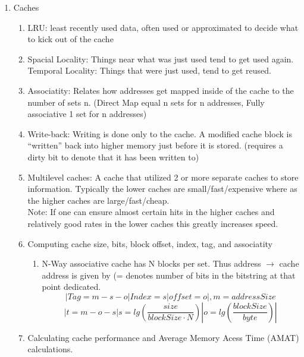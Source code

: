 \documentclass[12pt]{article}
\renewcommand{\=}[1]{\stackrel{#1}{=}} %
\theoremstyle{definition}
\theoremstyle{remark}
\begin{document}
  \begin{enumerate}
  \item Caches
    \begin{enumerate}
    \item LRU: least recently used data, often used or approximated to
      decide what to kick out of the cache
    \item
      Spacial Locality: Things near what was just used tend to get used
      again.\\
      Temporal Locality: Things that were just used, tend to get reused.
    \item Associatity: Relates how addresses get mapped inside of
      the cache to the number of sets n. (Direct Map equal n sets for
      n addresses, Fully associative 1 set for n addresses)
    \item Write-back: Writing is done only to the cache. A modified
      cache block is ``written'' back into higher memory just before
      it is stored. (requires a dirty bit to denote that it has been
      written to)
    \item Multilevel caches: A cache that utilized 2 or more separate
      caches to store information. Typically the lower caches are
      small/fast/expensive where as the higher caches are
      large/fast/cheap.\\
      Note: If one can ensure almost certain hits in the higher caches
      and relatively good rates in the lower caches this greatly
      increases speed.
    \item Computing cache size, bits, block offset, index, tag, and associatity
      \begin{enumerate}
      \item N-Way associative cache has N blocks per set. Thus
        address $\rightarrow$ cache address is given by (= denotes
        number of bits in the bitstring at that point dedicated.
        \begin{equation}
          |Tag=m-s-o|Index=s|offset=o|, m = addressSize
        \end{equation}
        \begin{equation}
          |t = m-o-s | s = lg(\frac{size}{blockSize\cdot N})|o = lg(\frac{blockSize}{byte})|
        \end{equation}
      \end{enumerate}
    \item Calculating cache performance and Average Memory Acess Time (AMAT) calculations.
      \begin{enumerate}

\end{enumerate}
\end{enumerate}
\end{enumerate}
\end{document}
